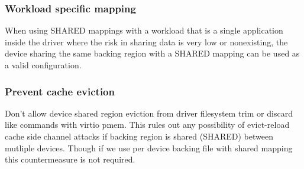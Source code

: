 \subsubsection{Workload specific mapping}\label{sec:Device Types / PMEM Device / Possible Security Implications / Countermeasures / Workload}
When using SHARED mappings with a workload that is a single application
inside the driver where the risk in sharing data is very low or
nonexisting, the device sharing the same backing region with a SHARED
mapping can be used as a valid configuration.

\subsubsection{Prevent cache eviction}\label{sec:Device Types / PMEM Device / Possible Security Implications / Countermeasures / Cache eviction}
Don't allow device shared region eviction from driver filesystem trim or discard
like commands with virtio pmem. This rules out any possibility of evict-reload
cache side channel attacks if backing region is shared (SHARED)
between mutliple devices. Though if we use per device backing file with
shared mapping this countermeasure is not required.
